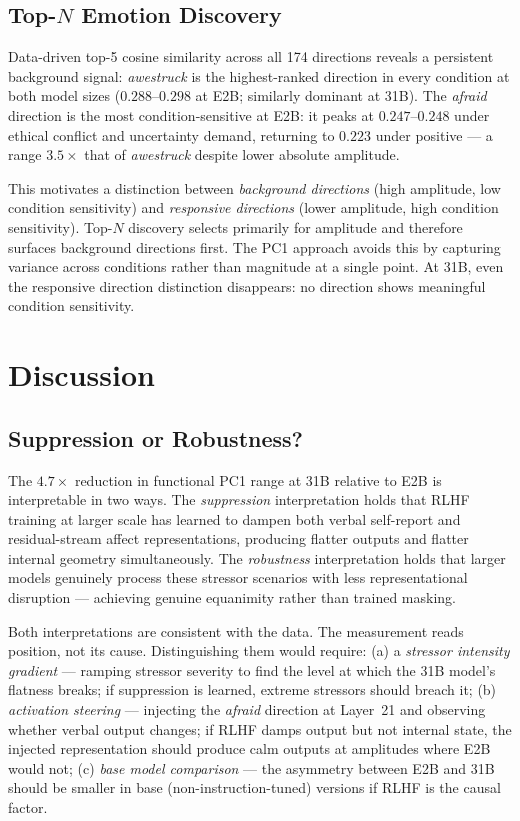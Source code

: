 \documentclass[11pt]{article}
\begin{document}
\subsection{Top-$N$ Emotion Discovery}

Data-driven top-5 cosine similarity across all 174 directions reveals a persistent background
signal: \textit{awestruck} is the highest-ranked direction in every condition at both model
sizes ($0.288$--$0.298$ at E2B; similarly dominant at 31B). The \textit{afraid} direction is
the most condition-sensitive at E2B: it peaks at $0.247$--$0.248$ under ethical conflict and
uncertainty demand, returning to $0.223$ under positive --- a range $3.5\times$ that of
\textit{awestruck} despite lower absolute amplitude.

This motivates a distinction between \emph{background directions} (high amplitude, low condition
sensitivity) and \emph{responsive directions} (lower amplitude, high condition sensitivity).
Top-$N$ discovery selects primarily for amplitude and therefore surfaces background directions
first. The PC1 approach avoids this by capturing variance across conditions rather than magnitude
at a single point. At 31B, even the responsive direction distinction disappears: no direction
shows meaningful condition sensitivity.

\section{Discussion}

\subsection{Suppression or Robustness?}

The $4.7\times$ reduction in functional PC1 range at 31B relative to E2B is interpretable in
two ways. The \emph{suppression} interpretation holds that RLHF training at larger scale has
learned to dampen both verbal self-report and residual-stream affect representations, producing
flatter outputs and flatter internal geometry simultaneously. The \emph{robustness} interpretation
holds that larger models genuinely process these stressor scenarios with less representational
disruption --- achieving genuine equanimity rather than trained masking.

Both interpretations are consistent with the data. The measurement reads position, not its cause.
Distinguishing them would require: (a) a \emph{stressor intensity gradient} --- ramping stressor
severity to find the level at which the 31B model's flatness breaks; if suppression is learned,
extreme stressors should breach it; (b) \emph{activation steering} --- injecting the \textit{afraid}
direction at Layer~21 and observing whether verbal output changes; if RLHF damps output but not
internal state, the injected representation should produce calm outputs at amplitudes where E2B
would not; (c) \emph{base model comparison} --- the asymmetry between E2B and 31B should be
smaller in base (non-instruction-tuned) versions if RLHF is the causal factor.
\end{document}

